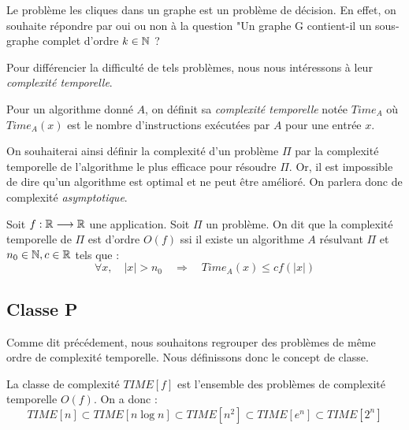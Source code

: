 \begin{example}
    Le problème les cliques dans un graphe est un problème de décision. En effet, on souhaite répondre par 
    oui ou non à la question "Un graphe G contient-il un sous-graphe complet d'ordre $k \in \mathbb{N}$ ?
\end{example}

Pour différencier la difficulté de tels problèmes, nous nous intéressons à leur \emph{complexité temporelle}.

\begin{definition}
    Pour un algorithme donné $A$, on définit sa \emph{complexité temporelle} notée $ Time_A$
    où $ Time_A(x)$ est le nombre d'instructions exécutées par $A$ pour une entrée $x$.
\end{definition}

\begin{proposition}
    On souhaiterai ainsi définir la complexité d'un problème $ \Pi$ par la complexité temporelle 
    de l'algorithme le plus efficace pour résoudre $ \Pi$. Or, il est impossible de dire qu'un algorithme 
    est optimal et ne peut être amélioré. On parlera donc de complexité \emph{asymptotique}.
\end{proposition}

\begin{definition}
    Soit $f : \mathbb{R} \longrightarrow \mathbb{R}$ une application. Soit $ \Pi$ un problème. On dit que la complexité 
    temporelle de $ \Pi$ est d'ordre $ O(f)$ ssi il existe un algorithme $A$ résulvant $ \Pi$ et 
    $n_0 \in \mathbb{N}, c \in \mathbb{R}$ tels que : 
        \begin{equation}
            \forall x, \quad |x| > n_0 \quad \Longrightarrow \quad Time_A(x) \leqslant c f(|x|)
        \end{equation}
\end{definition}

\subsection{Classe P}

Comme dit précédement, nous souhaitons regrouper des problèmes de même ordre de 
complexité temporelle. Nous définissons donc le concept de classe. 

\begin{definition}
    La classe de complexité $ TIME[f]$ est l'ensemble des problèmes de complexité temporelle $ O(f)$.
    On a donc : 
        $$ TIME[n] \subset TIME[n \log n] \subset TIME[n^2] \subset TIME[e^n] \subset TIME[2^n] $$
\end{definition}

